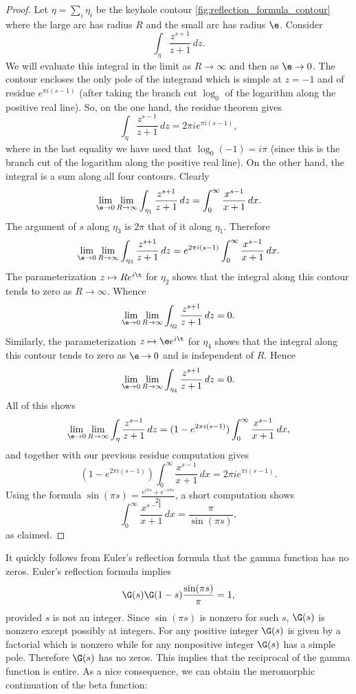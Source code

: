 \begin{proof}
    Let \(\eta = \sum_{i}\eta_{i}\) be the keyhole contour \cref{fig:reflection_formula_contour} where the large arc has radius \(R\) and the small arc has radius \(\e\). Consider
    \[
      \int_{\eta}\frac{z^{s+1}}{z+1}\,dz.
    \]
    We will evaluate this integral in the limit as \(R \to \infty\) and then as \(\e \to 0\). The contour encloses the only pole of the integrand which is simple at \(z = -1\) and of residue \(e^{\pi i(s-1)}\) (after taking the branch cut \(\log_{0}\) of the logarithm along the positive real line). So, on the one hand, the residue theorem gives
    \[
      \int_{\eta}\frac{z^{s-1}}{z+1}\,dz = 2\pi ie^{\pi i(s-1)},
    \]
    where in the last equality we have used that \(\log_{0}(-1) = i\pi\) (since this is the branch cut of the logarithm along the positive real line). On the other hand, the integral is a sum along all four contours. Clearly
    \[
      \lim_{\e \to 0}\lim_{R \to \infty}\int_{\eta_{1}}\frac{z^{s+1}}{z+1}\,dz = \int_{0}^{\infty}\frac{x^{s-1}}{x+1}\,dx.
    \]
    The argument of \(s\) along \(\eta_{3}\) is \(2\pi\) that of it along \(\eta_{1}\). Therefore
    \[
      \lim_{\e \to 0}\lim_{R \to \infty}\int_{\eta_{3}}\frac{z^{s+1}}{z+1}\,dz = e^{2\pi i(s-1)}\int_{0}^{\infty}\frac{x^{s-1}}{x+1}\,dx.
    \]
    The parameterization \(z \mapsto Re^{i\t}\) for \(\eta_{2}\) shows that the integral along this contour tends to zero as \(R \to \infty\). Whence
    \[
      \lim_{\e \to 0}\lim_{R \to \infty}\int_{\eta_{2}}\frac{z^{s+1}}{z+1}\,dz = 0.
    \]
    Similarly, the parameterization \(z \mapsto \e e^{i\t}\) for \(\eta_{4}\) shows that the integral along this contour tends to zero as \(\e \to 0\) and is independent of \(R\). Hence 
    \[
      \lim_{\e \to 0}\lim_{R \to \infty}\int_{\eta_{4}}\frac{z^{s+1}}{z+1}\,dz = 0.
    \]
    All of this shows
    \[
      \lim_{\e \to 0}\lim_{R \to \infty} \int_{\eta}\frac{z^{s-1}}{z+1}\,dz = (1-e^{2\pi i(s-1)})\int_{0}^{\infty}\frac{x^{s-1}}{x+1}\,dx,
    \]
    and together with our previous residue computation gives
    \[
      (1-e^{2\pi i(s-1)})\int_{0}^{\infty}\frac{x^{s-1}}{x+1}\,dx = 2\pi ie^{\pi i(s-1)}.
    \]
    Using the formula \(\sin(\pi s) = \frac{e^{i\pi s}+e^{-i\pi s}}{2i}\), a short computation shows
    \[
      \int_{0}^{\infty}\frac{x^{s-1}}{x+1}\,dx = \frac{\pi}{\sin(\pi s)},
    \]
    as claimed.
  \end{proof}

  It quickly follows from Euler's reflection formula that the gamma function has no zeros. Euler's reflection formula implies
  \[
    \G(s)\G(1-s)\frac{\sin(\pi s)}{\pi} = 1,
  \]
  provided \(s\) is not an integer. Since \(\sin(\pi s)\) is nonzero for such \(s\), \(\G(s)\) is nonzero except possibly at integers. For any positive integer \(\G(s)\) is given by a factorial which is nonzero while for any nonpositive integer \(\G(s)\) has a simple pole. Therefore \(\G(s)\) has no zeros. This implies that the reciprocal of the gamma function is entire. As a nice consequence, we can obtain the meromorphic continuation of the beta function:

